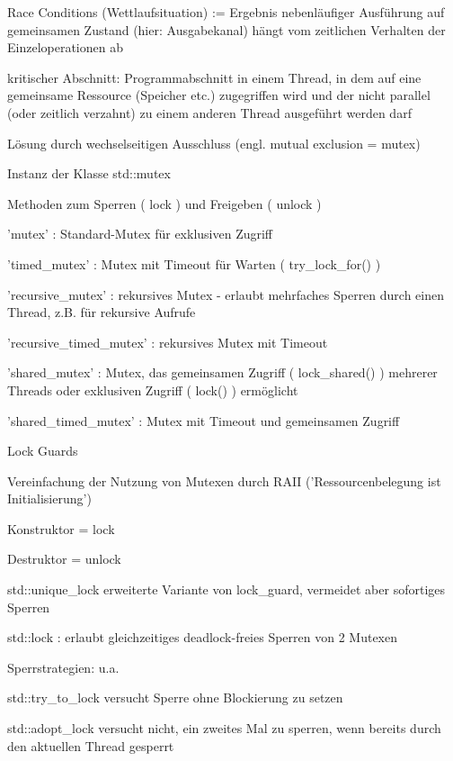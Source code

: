 \documentclass[10pt]{article}
\begin{document}
  
  \begin{itemize*}
    \item Race Conditions (Wettlaufsituation) := Ergebnis nebenläufiger Ausführung auf gemeinsamen Zustand (hier: Ausgabekanal) hängt vom zeitlichen Verhalten der Einzeloperationen ab
    \item kritischer Abschnitt: Programmabschnitt in einem Thread, in dem auf eine gemeinsame Ressource (Speicher etc.) zugegriffen wird und der nicht parallel (oder zeitlich verzahnt) zu einem anderen Thread ausgeführt werden darf
    \item Lösung durch wechselseitigen Ausschluss (engl. mutual exclusion = mutex)
    \begin{itemize*}
      \item Instanz der Klasse std::mutex
      \item Methoden zum Sperren ( lock ) und Freigeben ( unlock )
      \item 'mutex' : Standard-Mutex für exklusiven Zugriff
      \item 'timed\_mutex' : Mutex mit Timeout für Warten ( try\_lock\_for() )
      \item 'recursive\_mutex' : rekursives Mutex - erlaubt mehrfaches Sperren durch einen Thread, z.B. für rekursive Aufrufe
      \item 'recursive\_timed\_mutex' : rekursives Mutex mit Timeout
      \item 'shared\_mutex' : Mutex, das gemeinsamen Zugriff ( lock\_shared() ) mehrerer Threads oder exklusiven Zugriff ( lock() ) ermöglicht
      \item 'shared\_timed\_mutex' : Mutex mit Timeout und gemeinsamen Zugriff
    \end{itemize*}
    \item Lock Guards
    \begin{itemize*}
      \item Vereinfachung der Nutzung von Mutexen durch RAII ('Ressourcenbelegung ist Initialisierung')
      \item Konstruktor = lock
      \item Destruktor = unlock
      \item std::unique\_lock erweiterte Variante von lock\_guard, vermeidet aber sofortiges Sperren
      \item std::lock : erlaubt gleichzeitiges deadlock-freies Sperren von 2 Mutexen
      \item Sperrstrategien: u.a.
      \begin{itemize*}
        \item std::try\_to\_lock versucht Sperre ohne Blockierung zu setzen
        \item std::adopt\_lock versucht nicht, ein zweites Mal zu sperren, wenn bereits durch den aktuellen Thread gesperrt
      \end{itemize*}
    \end{itemize*}
  \end{itemize*}
  
\end{document}
